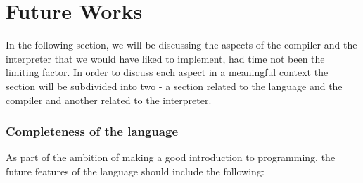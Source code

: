 \chapter{Future Works}

In the following section, we will be discussing the aspects of the compiler and the interpreter that we would have liked to implement, had time not been the limiting factor. In order to discuss each aspect in a meaningful context the section will be subdivided into two - a section related to the language and the compiler and another related to the interpreter.

\subsection*{Completeness of the language}
As part of the ambition of making \dazel{} a good introduction to programming, the future features of the language should include the following: 

